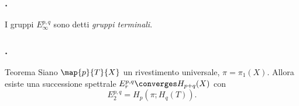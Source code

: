 \begin{frame}
\frametitle{.}
I gruppi $E^{p,q}_\infty$ sono detti \emph{gruppi terminali}.
\vspace{0.5cm}
\end{frame}
\begin{frame}
\frametitle{.}
\begin{block}{Teorema}
Siano \(\map{p}{T}{X}\) un rivestimento universale, \(\pi=\pi_1(X)\). Allora esiste una successione spettrale \(E^{p,q}_r\converges H_{p+q}(X)\) con
\[
E^{p,q}_2=H_p(\pi;H_q(T)).
\]
\end{block}
\end{frame}